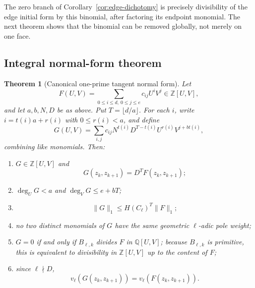 \documentclass[11pt,oneside]{article}
\newtheorem{theorem}{Theorem}[section]
\theoremstyle{definition}
\theoremstyle{remark}
\newcommand{\Z}{\mathbb Z}
\newcommand{\Q}{\mathbb Q}
\begin{document}
The zero branch of Corollary~\ref{cor:edge-dichotomy} is precisely divisibility of the edge
initial form by this binomial, after factoring its endpoint monomial.  The next theorem shows
that the binomial can be removed globally, not merely on one face.

\subsection{Integral normal-form theorem}

\begin{theorem}[Canonical one-prime tangent normal form]
\label{thm:one-prime-normal-form}
Let
\[
 F(U,V)=\sum_{0\le i\le d,\ 0\le j\le e}c_{ij}U^iV^j\in\Z[U,V],
\]
and let $a,b,N,D$ be as above.  Put $T=\lfloor d/a\rfloor$.  For each $i$, write
$i=t(i)a+r(i)$ with $0\le r(i)<a$, and define
\begin{equation}
 G(U,V)
 =\sum_{i,j}c_{ij}N^{t(i)}D^{T-t(i)}
   U^{r(i)}V^{j+b t(i)},
 \label{eq:normal-G-raw}
\end{equation}
combining like monomials.  Then:
\begin{enumerate}
\item $G\in\Z[U,V]$ and
\begin{equation}
 G(z_k,z_{k+1})=D^T F(z_k,z_{k+1});
 \label{eq:normal-eval}
\end{equation}
\item $\deg_U G<a$ and $\deg_VG\le e+bT$;
\item
\begin{equation}
 \lVert G\rVert_1\le H(C_\ell)^T\lVert F\rVert_1;
 \label{eq:normal-height}
\end{equation}
\item no two distinct monomials of $G$ have the same geometric $\ell$-adic pole weight;
\item $G=0$ if and only if $B_{\ell,k}$ divides $F$ in $\Q[U,V]$; because
$B_{\ell,k}$ is primitive, this is equivalent to divisibility in $\Z[U,V]$ up to the
content of $F$;
\item since $\ell\nmid D$,
\begin{equation}
 v_\ell(G(z_k,z_{k+1}))=v_\ell(F(z_k,z_{k+1})).
 \label{eq:normal-v}
\end{equation}
\end{enumerate}
\end{theorem}
\end{document}
